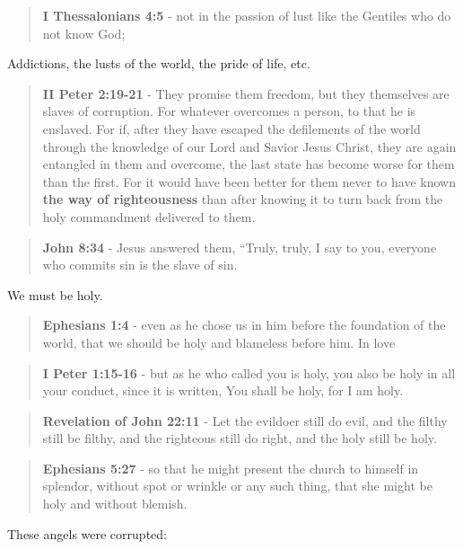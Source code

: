 \documentclass[11pt]{article}
\begin{document}
\begin{quote}
\textbf{I Thessalonians 4:5} - not in the passion of lust like the Gentiles who do not know God;
\end{quote}

Addictions, the lusts of the world, the pride of life, etc.

\begin{quote}
\textbf{II Peter 2:19-21} - They promise them freedom, but they themselves are slaves of corruption. For whatever overcomes a person, to that he is enslaved. For if, after they have escaped the defilements of the world through the knowledge of our Lord and Savior Jesus Christ, they are again entangled in them and overcome, the last state has become worse for them than the first. For it would have been better for them never to have known \textbf{the way of righteousness} than after knowing it to turn back from the holy commandment delivered to them.
\end{quote}

\begin{quote}
\textbf{John 8:34} - Jesus answered them, “Truly, truly, I say to you, everyone who commits sin is the slave of sin.
\end{quote}

We must be holy.

\begin{quote}
\textbf{Ephesians 1:4} - even as he chose us in him before the foundation of the world, that we should be holy and blameless before him. In love
\end{quote}

\begin{quote}
\textbf{I Peter 1:15-16} - but as he who called you is holy, you also be holy in all your conduct, since it is written, You shall be holy, for I am holy.
\end{quote}

\begin{quote}
\textbf{Revelation of John 22:11} - Let the evildoer still do evil, and the filthy still be filthy, and the righteous still do right, and the holy still be holy.
\end{quote}

\begin{quote}
\textbf{Ephesians 5:27} - so that he might present the church to himself in splendor, without spot or wrinkle or any such thing, that she might be holy and without blemish.
\end{quote}

These angels were corrupted:
\end{document}
